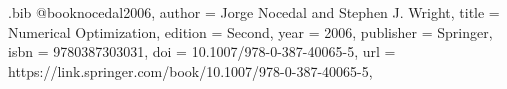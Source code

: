 


\begin{filecontents}[overwrite]{\jobname.bib}
@book{nocedal2006,
  author    = {Jorge Nocedal and Stephen J. Wright},
  title     = {Numerical Optimization},
  edition   = {Second},
  year      = {2006},
  publisher = {Springer},
  isbn      = {9780387303031},
  doi       = {10.1007/978-0-387-40065-5},
  url       = {https://link.springer.com/book/10.1007/978-0-387-40065-5},
}
\end{filecontents}


\documentclass[9pt, headings=standardclasses, parskip=half]{scrartcl}
\usepackage{ifthen}
\usepackage{iftex}
\usepackage{csquotes}


\usepackage[automark]{scrlayer-scrpage}
\clearpairofpagestyles
\ofoot{\pagemark} %


\usepackage{graphicx}
\usepackage[dvipsnames]{xcolor}
\usepackage{soul}

\usepackage[left=30mm, right=30mm, top=20mm, bottom=30mm]{geometry}

\usepackage{amsmath, amssymb, amsthm}
\usepackage{mathtools}
\usepackage{mathdots} %
\DeclareMathOperator*{\argmax}{arg\,max}
\DeclareMathOperator*{\argmin}{arg\,min}

\usepackage{enumitem}
\renewcommand{\labelitemi}{\textbullet}
\renewcommand{\labelitemii}{\raisebox{0.1ex}{\scalebox{0.8}{\textbullet}}}
\renewcommand{\labelitemiii}{\raisebox{0.2ex}{\scalebox{0.6}{\textbullet}}}
\renewcommand{\labelitemiv}{\raisebox{0.3ex}{\scalebox{0.4}{\textbullet}}}

